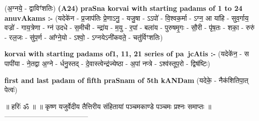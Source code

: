 \documentclass[17pt]{extarticle}
\begin{document}
                  \newline
                      (अ॒ग्नये॒ - द्वाविꣳ॑शतिः)  \textbf{(A24)} \newline \newline
\textbf{praSna korvai with starting padams of 1 to 24 anuvAkams :-} \newline
(यदेके॑न - प्र॒जाप॑तिः प्रे॒णाऽनु॒ - यजु॒षा - ऽऽपो॑ - वि॒श्वक॒र्मा - ऽग्न॒ आ या॑हि - सुव॒र्गाय॒ वज्रो॑ - गाय॒त्रेणा - ग्न॑ उदधे - स॒मीची - न्द्रा॑य - म॒यु - र॒पां - बला॑य - पुरुषमृ॒गः - सौ॒री - पृ॑ष॒तः - शका॒ - रुरु॑ - रल॒जः - सु॑प॒र्ण - आ᳚ग्ने॒यो - ऽश्वो॒ - ऽग्नयेऽनी॑कवते॒ - चतु॑र्विꣳशतिः) \newline

\textbf{korvai with starting padams of1, 11, 21 series of pa~jcAtis :-} \newline
(यदेके॑न॒ - स पापी॑या - ने॒तद्वा अ॒ग्ने - र्धनु॒स्तद् - दे॒वास्त्वेन्द्र॑ज्येष्ठा - अ॒पां नप्त्रे - ऽश्व॑स्तूप॒रो - द्विष॑ष्टिः) \newline

\textbf{first and last padam of fifth praSnam of 5th kANDam} \newline
(यदेके॒ - नैक॑शितिपा॒त् पेत्वः॑) \newline 


॥ हरिः॑ ॐ ॥
॥ कृष्ण यजुर्वेदीय तैत्तिरीय संहितायां पञ्चमकाण्डे पञ्चमः प्रश्नः समाप्तः ॥
------------------------------------ \newline
\pagebreak
\pagebreak
        
\end{document}
